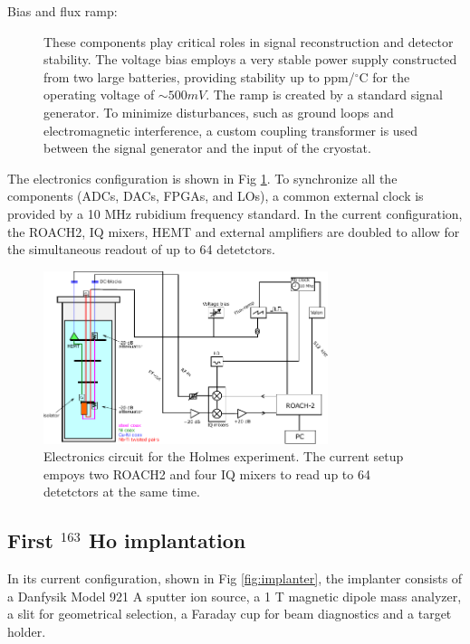 \begin{description}
\item[Bias and flux ramp:]
These components play critical roles in signal reconstruction and detector stability.
The voltage bias employs a very stable power supply constructed from two large batteries, providing
stability up to ppm/$^\circ$C for the operating voltage of $\sim 500mV$.
The ramp is created by a standard signal generator. To minimize disturbances, such as ground loops and electromagnetic
interference, a custom coupling transformer is used between the signal generator and the input of the cryostat.

\end{description}
The electronics configuration is shown in Fig \ref{fig:warmelrctronics}. To synchronize all the components (ADCs, DACs,
FPGAs, and LOs), a common external clock is provided by a 10 MHz rubidium frequency standard. In the current
configuration, the ROACH2, IQ mixers, HEMT and external amplifiers are doubled to allow for the simultaneous readout of up to 64
detetctors.

\begin{figure}[t]
  \centering
  \includegraphics[width=0.74\textwidth]{figures/ch1/warmcircuit.pdf}
  \caption{Electronics circuit for the Holmes experiment. The current setup empoys two ROACH2 and four IQ mixers to read
  up to 64 detetctors at the same time.}
  \label{fig:warmelrctronics}
\end{figure}

\subsection{First $^{163}$ Ho implantation}
In its current configuration, shown in Fig \ref{fig:implanter}, the implanter consists of a Danfysik Model 921 A sputter ion
source, a 1 T magnetic dipole mass analyzer, a slit for geometrical selection, a Faraday cup for beam diagnostics and a target holder. 


